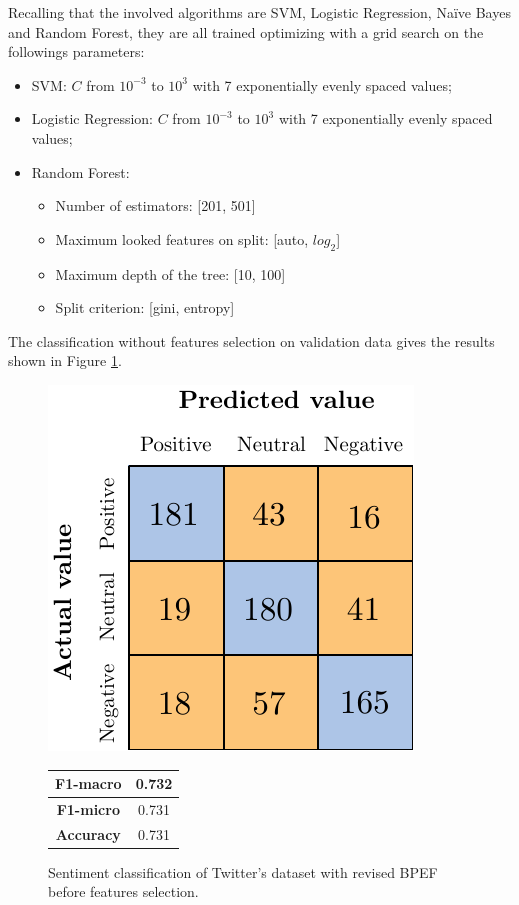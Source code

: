 Recalling that the involved algorithms are SVM, Logistic Regression, Na{\"i}ve Bayes and Random Forest, they are all trained optimizing with a grid search on the followings parameters:
\begin{itemize}
	\item SVM: $C$ from $10^{-3}$ to $10^3$ with 7 exponentially evenly spaced values;
	\item Logistic Regression: $C$ from $10^{-3}$ to $10^3$ with 7 exponentially evenly spaced values;
	\item Random Forest: 
	\begin{itemize}
		\item Number of estimators: [201, 501]
		\item Maximum looked features on split: [auto, $log_2$]
		\item Maximum depth of the tree: [10, 100]
		\item Split criterion: [gini, entropy]
	\end{itemize}
\end{itemize}

The classification without features selection on validation data gives the results shown in Figure \ref{fig:tw_snt_bpef_bfs}.

\begin{figure}[H]
\begin{minipage}[b]{0.6\linewidth}
	\centering
	\includegraphics[scale=1]{figures/conf_matrices/twitter_snt_bpef/twitter_snt_bpef_bfs.pdf}
\end{minipage}
\begin{minipage}[b]{0.3\linewidth}
	\begin{tabular}[b]{ | c | c | } 
		\hline
		\textbf{F1-macro} & 0.732 \\
		\hline
		\textbf{F1-micro} & 0.731 \\ 
		\hline
		\textbf{Accuracy} & 0.731 \\ 
		\hline
	\end{tabular}
\end{minipage}
	\caption{Sentiment classification of Twitter's dataset with revised BPEF before features selection.}
	\label{fig:tw_snt_bpef_bfs}
\end{figure}


